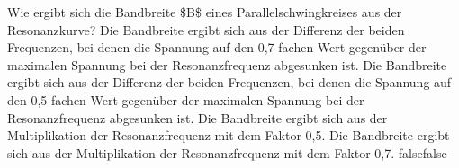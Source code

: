     {Wie ergibt sich die Bandbreite \$B\$ eines Parallelschwingkreises aus der Resonanzkurve?}
    {Die Bandbreite ergibt sich aus der Differenz der beiden Frequenzen, bei denen die Spannung auf den 0,7-fachen Wert gegenüber der maximalen Spannung bei der Resonanzfrequenz abgesunken ist.}
    {Die Bandbreite ergibt sich aus der Differenz der beiden Frequenzen, bei denen die Spannung auf den 0,5-fachen Wert gegenüber der maximalen Spannung bei der Resonanzfrequenz abgesunken ist.}
    {Die Bandbreite ergibt sich aus der Multiplikation der Resonanzfrequenz mit dem Faktor 0,5.}
    {Die Bandbreite ergibt sich aus der Multiplikation der Resonanzfrequenz mit dem Faktor 0,7.}
    {false}{false}